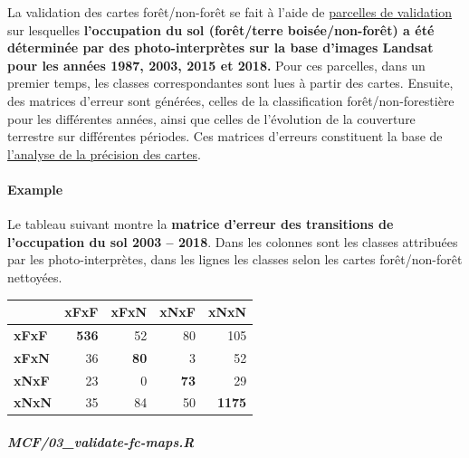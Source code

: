 \documentclass[a4paper, notitlepage, 12pt, krantz2]{krantz}
\let\oldparagraph\paragraph
\renewcommand{\paragraph}[1]{\oldparagraph{#1}\mbox{}}
\begin{document}
La validation des cartes forêt/non-forêt se fait à l'aide de \protect\hyperlink{SSTS-validation-plots}{parcelles de validation} sur lesquelles \textbf{l'occupation du sol (forêt/terre boisée/non-forêt) a été déterminée par des photo-interprètes sur la base d'images Landsat pour les années 1987, 2003, 2015 et 2018.} Pour ces parcelles, dans un premier temps, les classes correspondantes sont lues à partir des cartes. Ensuite, des matrices d'erreur sont générées, celles de la classification forêt/non-forestière pour les différentes années, ainsi que celles de l'évolution de la couverture terrestre sur différentes périodes. Ces matrices d'erreurs constituent la base de \protect\hyperlink{FCC-map-precision}{l'analyse de la précision des cartes}.

\hypertarget{example-4}{%
\paragraph{Example}\label{example-4}}

Le tableau suivant montre la \textbf{matrice d'erreur des transitions de l'occupation du sol 2003 -- 2018}. Dans les colonnes sont les classes attribuées par les photo-interprètes, dans les lignes les classes selon les cartes forêt/non-forêt nettoyées.

\begin{longtable}[]{@{}lrrrr@{}}
\toprule
& xFxF & xFxN & xNxF & xNxN\tabularnewline
\midrule
\endhead
\textbf{xFxF} & \textbf{536} & 52 & 80 & 105\tabularnewline
\textbf{xFxN} & 36 & \textbf{80} & 3 & 52\tabularnewline
\textbf{xNxF} & 23 & 0 & \textbf{73} & 29\tabularnewline
\textbf{xNxN} & 35 & 84 & 50 & \textbf{1175}\tabularnewline
\bottomrule
\end{longtable}

\hypertarget{mcf03_validate-fc-maps.r}{%
\paragraph{\texorpdfstring{\emph{MCF/03\_validate-fc-maps.R}}{MCF/03\_validate-fc-maps.R}}\label{mcf03_validate-fc-maps.r}}
\end{document}
